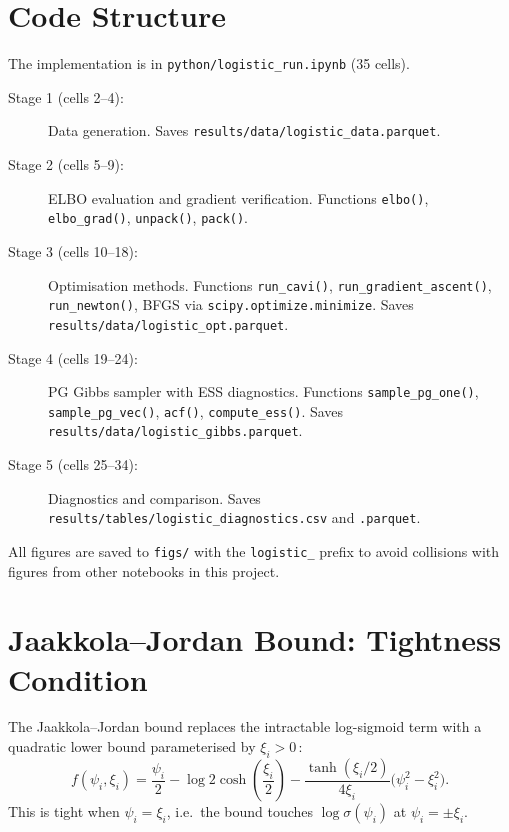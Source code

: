 \documentclass[11pt,a4paper]{article}
\begin{document}
\newpage
\section{Code Structure}
\label{app:code}

The implementation is in \texttt{python/logistic\_run.ipynb} (35 cells).

\begin{description}
  \item[Stage 1 (cells 2--4):] Data generation.
    Saves \texttt{results/data/logistic\_data.parquet}.
  \item[Stage 2 (cells 5--9):] ELBO evaluation and gradient verification.
    Functions \texttt{elbo()}, \texttt{elbo\_grad()}, \texttt{unpack()}, \texttt{pack()}.
  \item[Stage 3 (cells 10--18):] Optimisation methods.
    Functions \texttt{run\_cavi()}, \texttt{run\_gradient\_ascent()},
    \texttt{run\_newton()}, BFGS via \texttt{scipy.optimize.minimize}.
    Saves \texttt{results/data/logistic\_opt.parquet}.
  \item[Stage 4 (cells 19--24):] PG Gibbs sampler with ESS diagnostics.
    Functions \texttt{sample\_pg\_one()}, \texttt{sample\_pg\_vec()},
    \texttt{acf()}, \texttt{compute\_ess()}.
    Saves \texttt{results/data/logistic\_gibbs.parquet}.
  \item[Stage 5 (cells 25--34):] Diagnostics and comparison.
    Saves \texttt{results/tables/logistic\_diagnostics.csv} and \texttt{.parquet}.
\end{description}

All figures are saved to \texttt{figs/} with the \texttt{logistic\_} prefix to avoid
collisions with figures from other notebooks in this project.

\newpage
\section{Jaakkola--Jordan Bound: Tightness Condition}
\label{app:jj-bound}

The Jaakkola--Jordan bound replaces the intractable log-sigmoid term with a quadratic
lower bound parameterised by $\xi_i > 0$\,\parencite{Jaakkola2000}:
\begin{equation*}
  f(\psi_i, \xi_i) = \frac{\psi_i}{2} - \log 2\cosh\!\left(\frac{\xi_i}{2}\right)
  - \frac{\tanh(\xi_i/2)}{4\xi_i}\bigl(\psi_i^2 - \xi_i^2\bigr).
\end{equation*}
This is tight when $\psi_i = \xi_i$, i.e.\ the bound touches $\log\sigma(\psi_i)$ at
$\psi_i = \pm\xi_i$.
\end{document}
